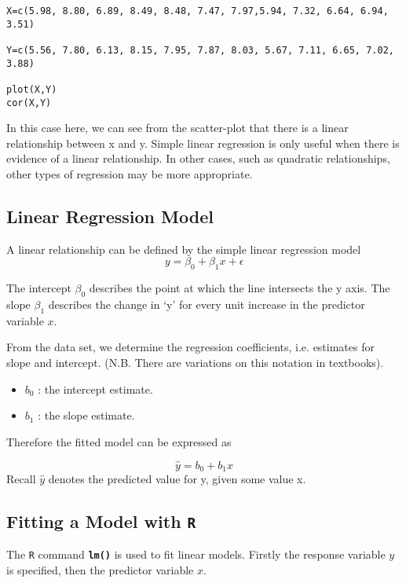 \documentclass[a4paper,12pt]{article}
\begin{document}
\begin{framed}
\begin{verbatim}
X=c(5.98, 8.80, 6.89, 8.49, 8.48, 7.47, 7.97,5.94, 7.32, 6.64, 6.94, 3.51)

Y=c(5.56, 7.80, 6.13, 8.15, 7.95, 7.87, 8.03, 5.67, 7.11, 6.65, 7.02, 3.88)

plot(X,Y)
cor(X,Y)
\end{verbatim}
\end{framed}
In this case here, we can see from the scatter-plot that there is a linear relationship between x and y.
Simple linear regression is only useful when there is evidence of a linear relationship. In other cases, such as quadratic relationships, other types of regression may be more appropriate.

\subsection{Linear Regression Model}

A linear relationship can be defined by the simple linear regression model
\[y = \beta_0 + \beta_1x + \epsilon\]

The intercept $\beta_0$ describes the point at which the line intersects the y axis.
The slope $\beta_1$ describes the change in ‘y’ for every unit increase in the predictor variable $x$.

From the data set, we determine the regression coefficients, i.e. estimates for slope and intercept. (N.B. There are variations on this notation in textbooks).

\begin{itemize}	\item $b_0$ : the intercept estimate.
\item	$b_1$ : the slope estimate.
\end{itemize}

Therefore the fitted model can be expressed as

\[ \hat{y} = b_0 + b_1x \]
Recall $\hat{y}$  denotes the predicted value for y, given some value x.

\subsection{Fitting a Model with \texttt{R}}

The  \texttt{R} command   \texttt{\textbf{lm()}} is used to fit linear models. Firstly the response variable $y$  is specified, then the predictor variable $x$.
\end{document}

